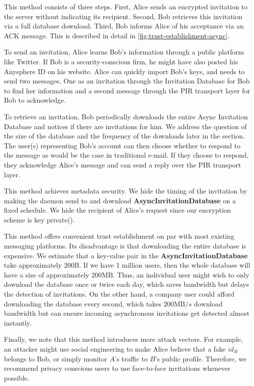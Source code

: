 This method consists of three steps. First, Alice sends an encrypted invitation to the server without indicating its recipient. Second, Bob retrieves this invitation via a full database download. Third, Bob informs Alice of his acceptance via an ACK message. This is described in detail in \cref{fig:trust-establishment-async}.

To send an invitation, Alice learns Bob's information through a public platform like Twitter. If Bob is a security-conscious firm, he might have also posted his Anysphere ID on his website. Alice can quickly import Bob's keys, and needs to send two messages. One as an invitation through the Invitation Database for Bob to find her information and a second message through the PIR transport layer for Bob to acknowledge.

To retrieve an invitation, Bob periodically downloads the entire Async Invitation Database and notices if there are invitations for him. 
We address the question of the size of the database and the frequency of the downloads later in the section. 
The user(s) representing Bob's account can then choose whether to respond to the message as would be the case in traditional e-mail. If they choose to respond, they acknowledge Alice's message and can send a reply over the PIR transport layer.

This method achieves metadata security. We hide the timing of the invitation by making the daemon send to and download \textbf{AsyncInvitationDatabase} on a fixed schedule. 
We hide the recipient of Alice's request since our encryption scheme is key private(). 

This method offers convenient trust establishment on par with most existing messaging platforms. 
Its disadvantage is that downloading the entire database is expensive. 
We estimate that a key-value pair in the \textbf{AsyncInvitationDatabase} take approximately $200\text{B}$. 
If we have 1 million users, then the whole database will have a size of approximately $200\text{MB}$.
Thus, an individual user might wish to only download the database once or twice each day, which saves bandwidth but delays the detection of invitations. 
On the other hand, a company user could afford downloading the database every second, which takes $200\text{MB}/s$ download bandwidth but can ensure incoming asynchronous invitations get detected almost instantly.

Finally, we note that this method introduces more attack vectors. For example, an attacker might use social engineering to make Alice believe that a fake $id_B$ belongs to Bob, or simply monitor $A$'s traffic to $B$'s public profile. Therefore, we recommend privacy conscious users to use face-to-face invitations whenever possible.